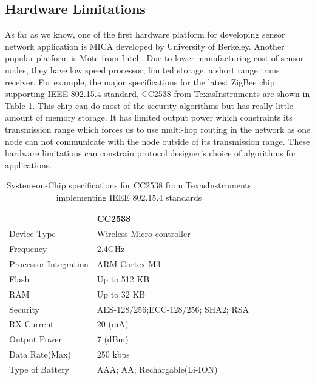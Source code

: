 	\subsection{Hardware Limitations}
		As far as we know, one of the first hardware platform for developing sensor network application is MICA \cite{hill2002mica} developed by University of Berkeley.
		Another popular platform is Mote from Intel \cite{arazi2006self}.
		Due to lower manufacturing cost of sensor nodes, they have low speed processor, limited storage, a short range trans receiver.
		For example, the major specifications for the latest ZigBee chip supporting IEEE 802.15.4 standard, CC2538 from TexasInstruments are shown in Table \ref{table:soc}.
		This chip can do most of the security algorithms but has really little amount of memory storage. It has limited output power which constraints its transmission range which forces us to use multi-hop routing in the network as one node can not communicate with the node outside of its transmission range.
		These hardware limitations can constrain protocol designer's choice of algorithms for applications.  
		\begin{table}[!htb]	
			\begin{center}
				\begin{tabular}{ |l| l| }
					\hline
				     & CC2538 \\
				    \hline
				    Device Type & Wireless Micro controller \\
				    Frequency & 2.4GHz \\
				    Processor Integration & ARM Cortex-M3 \\
						Flash & Up to 512 KB \\
						RAM & Up to 32 KB \\
						Security & AES-128/256;ECC-128/256; SHA2; RSA \\
						RX Current & 20 (mA) \\
						Output Power & 7 (dBm) \\
						Data Rate(Max) & 250 kbps \\
						Type of Battery & AAA; AA; Rechargable(Li-ION) \\
				    \hline
				\end{tabular}
			\end{center}
			 \caption{System-on-Chip specifications for CC2538 from TexasInstruments implementing IEEE 802.15.4 standards}
			 \label{table:soc}
		\end{table}
	
